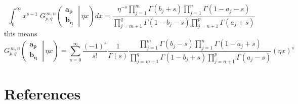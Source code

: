 \documentclass[journal=jcisd8,manuscript=article,layout=onecolumn,pdftex,floatfix,amsmath,amssymb,10pt]{achemso}
\begin{document}
\begin{equation}
\int_0^{\infty} x^{s - 1} \; G_{p,q}^{\,m,n} \!\left( \left. \begin{matrix} \mathbf{a_p} \\ \mathbf{b_q} \end{matrix} \; \right| \, \eta x \right) dx =
\frac{\eta^{-s} \prod_{j = 1}^{m} \Gamma (b_j + s) \prod_{j = 1}^{n} \Gamma (1 - a_j - s)} {\prod_{j = m + 1}^{q} \Gamma (1 - b_j - s) \prod_{j = n + 1}^{p} \Gamma (a_j + s)}
\end{equation}
this means
\begin{equation}
G_{p,q}^{\,m,n} \!\left( \left. \begin{matrix} \mathbf{a_p} \\ \mathbf{b_q} \end{matrix} \; \right| \, \eta x \right) = \sum_{s=0}^\infty \frac{(-1)^s}{s!} \frac{1}{\Gamma(s)} \frac{\prod_{j = 1}^{m} \Gamma (b_j - s) \prod_{j = 1}^{n} \Gamma (1 - a_j + s)} {\prod_{j = m + 1}^{q} \Gamma (1 - b_j + s) \prod_{j = n + 1}^{p} \Gamma (a_j - s)} (\eta x)^s
\end{equation}








\section{References}
\end{document}
